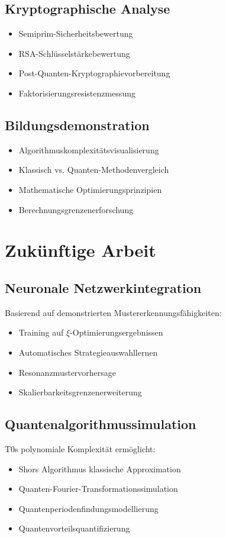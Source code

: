 \documentclass[12pt,a4paper]{article}
\begin{document}
	\subsection{Kryptographische Analyse}
	\begin{itemize}
		\item Semiprim-Sicherheitsbewertung
		\item RSA-Schlüsselstärkebewertung
		\item Post-Quanten-Kryptographievorbereitung
		\item Faktorisierungsresistenzmessung
	\end{itemize}
	
	\subsection{Bildungsdemonstration}
	\begin{itemize}
		\item Algorithmuskomplexitätsvisualisierung
		\item Klassisch vs. Quanten-Methodenvergleich
		\item Mathematische Optimierungsprinzipien
		\item Berechnungsgrenzenerforschung
	\end{itemize}
	
	\section{Zukünftige Arbeit}
	
	\subsection{Neuronale Netzwerkintegration}
	Basierend auf demonstrierten Mustererkennungsfähigkeiten:
	\begin{itemize}
		\item Training auf $\xi$-Optimierungsergebnissen
		\item Automatisches Strategieauswahllernen
		\item Resonanzmustervorhersage
		\item Skalierbarkeitsgrenzenerweiterung
	\end{itemize}
	
	\subsection{Quantenalgorithmussimulation}
	T0s polynomiale Komplexität ermöglicht:
	\begin{itemize}
		\item Shors Algorithmus klassische Approximation
		\item Quanten-Fourier-Transformationssimulation
		\item Quantenperiodenfindungsmodellierung
		\item Quantenvorteilsquantifizierung
	\end{itemize}
	
\end{document}
